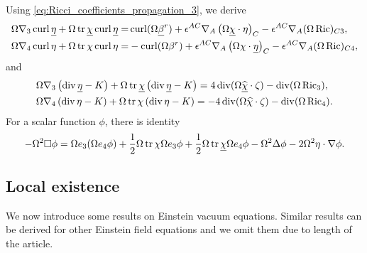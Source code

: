 Using \eqref{eq:Ricci_coefficients_propagation_3}, we derive 
\begin{equation}
  \begin{aligned}
      \Omega\nabla_3\operatorname{curl}\underline\eta+\Omega\operatorname{tr}\underline\chi\operatorname{curl}\underline\eta=&\operatorname{curl}(\Omega\underline\beta^r)+\epsilon^{AC}\nabla_A\left(\Omega\underline\chi\cdot\eta\right)_C-\epsilon^{AC}\nabla_A(\Omega\operatorname{Ric})_{C3},\\
      \Omega\nabla_4\operatorname{curl}\eta+\Omega\operatorname{tr}\chi\operatorname{curl}\eta=&-\operatorname{curl}(\Omega\beta^r)+\epsilon^{AC}\nabla_A\left(\Omega\chi\cdot\underline\eta\right)_C-\epsilon^{AC}\nabla_A(\Omega\operatorname{Ric})_{C4},
  \end{aligned}
\end{equation}
and
\begin{equation}
    \begin{aligned}
        &\Omega\nabla_3\left(\operatorname{div} \underline\eta-K\right)+\Omega\operatorname{tr}\underline\chi\left(\operatorname{div} \underline\eta-K\right)=4\operatorname{div}(\Omega\widehat{\underline\chi}\cdot\zeta)-\operatorname{div}(\Omega\operatorname{Ric}_3),\\
        &\Omega\nabla_4\left(\operatorname{div} \eta-K\right)+\Omega\operatorname{tr}\chi\left(\operatorname{div} \eta-K\right)=-4\operatorname{div}(\Omega\widehat\chi\cdot\zeta)-\operatorname{div}(\Omega\operatorname{Ric}_4).
    \end{aligned}
\end{equation}
For a scalar function $\phi$, there is identity
\begin{equation}\label{eq:ese-wave-eq}
    -\Omega^2\square\phi=\Omega e_3(\Omega e_4\phi)+\frac{1}{2}\Omega\operatorname{tr}\chi\Omega e_3\phi+\frac{1}{2}\Omega\operatorname{tr}\underline\chi\Omega e_4\phi-\Omega^2\Delta\phi-2\Omega^2\eta\cdot\nabla\phi.
\end{equation}

\subsection{Local existence}
We now introduce some results on Einstein vacuum equations. Similar results can be derived for other Einstein field equations and we omit them due to length of the article.

